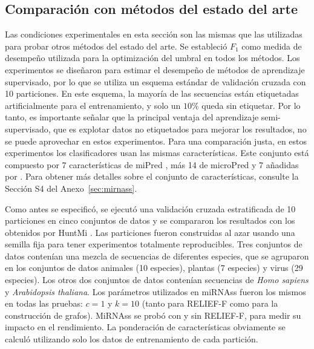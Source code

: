 \subsection*{Comparación con métodos del estado del arte}
Las condiciones experimentales en esta sección son las mismas que las utilizadas para probar otros métodos del estado del arte. Se estableció $ F_{1} $ como
medida de desempeño utilizada para la optimización del umbral en todos los métodos. Los experimentos se diseñaron para estimar el desempeño de métodos de
aprendizaje supervisado, por lo que se utiliza un esquema estándar de validación cruzada con 10 particiones. En este esquema, la mayoría de las secuencias
están etiquetadas artificialmente para el entrenamiento, y solo un $ 10 \% $ queda sin etiquetar. Por lo tanto, es importante señalar que la principal
ventaja del aprendizaje semi-supervisado, que es explotar datos no etiquetados para mejorar los resultados, no se puede aprovechar en estos experimentos.
Para una comparación justa, en estos experimentos los clasificadores usan las mismas características. Este conjunto está compuesto por 7 características de
miPred \citep{ng2007novo}, más 14 de microPred \citep{batuwita2009micropred} y 7 añadidas por \cite{gudys2013huntmi}. Para obtener más detalles sobre el
conjunto de características, consulte la Sección S4 del Anexo~\ref{sec:mirnass}.

Como antes se especificó, se ejecutó una validación cruzada estratificada de 10 particiones en cinco conjuntos de datos y se compararon los resultados con
los obtenidos por HuntMi \citep{gudys2013huntmi}. Las particiones fueron construidas al azar usando una semilla fija para tener experimentos totalmente
reproducibles. Tres conjuntos de datos contenían una mezcla de secuencias de diferentes especies, que se agruparon en los conjuntos de datos animales (10
especies), plantas (7 especies) y virus (29 especies). Los otros dos conjuntos de datos contenían secuencias de \textit{Homo sapiens} y \textit{Arabidopsis
thaliana}. Los parámetros utilizados en miRNAss fueron los mismos en todas las pruebas: $ c = 1 $ y $ k = 10 $ (tanto para RELIEF-F como para la construcción
de grafos). MiRNAss se probó con y sin RELIEF-F, para medir su impacto en el rendimiento. La ponderación de características obviamente se calculó
utilizando solo los datos de entrenamiento de cada partición.


